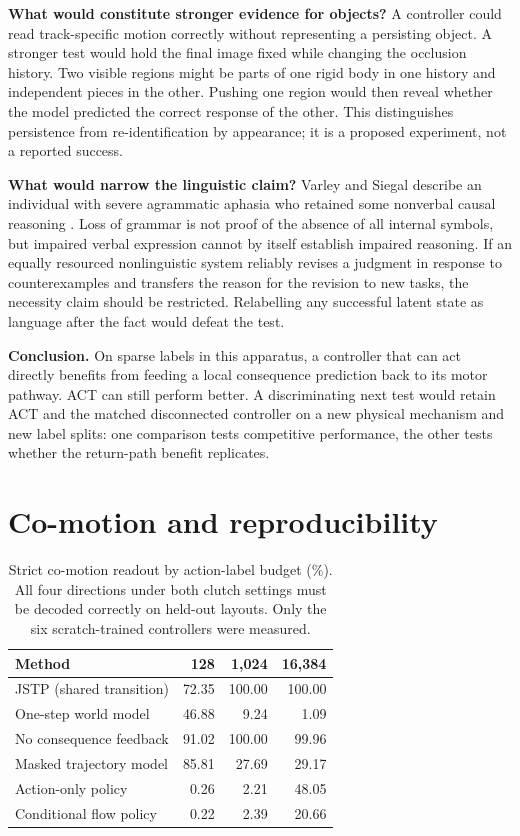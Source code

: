 \documentclass[11pt]{article}
\begin{document}
\textbf{What would constitute stronger evidence for objects?} A controller could read track-specific motion correctly without representing a persisting object. A stronger test would hold the final image fixed while changing the occlusion history. Two visible regions might be parts of one rigid body in one history and independent pieces in the other. Pushing one region would then reveal whether the model predicted the correct response of the other. This distinguishes persistence from re-identification by appearance; it is a proposed experiment, not a reported success.

\textbf{What would narrow the linguistic claim?} Varley and Siegal describe an individual with severe agrammatic aphasia who retained some nonverbal causal reasoning \cite{r16}. Loss of grammar is not proof of the absence of all internal symbols, but impaired verbal expression cannot by itself establish impaired reasoning. If an equally resourced nonlinguistic system reliably revises a judgment in response to counterexamples and transfers the reason for the revision to new tasks, the necessity claim should be restricted. Relabelling any successful latent state as language after the fact would defeat the test.

\textbf{Conclusion.} On sparse labels in this apparatus, a controller that can act directly benefits from feeding a local consequence prediction back to its motor pathway. ACT can still perform better. A discriminating next test would retain ACT and the matched disconnected controller on a new physical mechanism and new label splits: one comparison tests competitive performance, the other tests whether the return-path benefit replicates.

\FloatBarrier\appendix\setcounter{table}{0}

\section{Co-motion and reproducibility}

\begin{table}[htbp]
\centering\small\setlength{\tabcolsep}{3.5pt}
\caption{Strict co-motion readout by action-label budget (\%). All four directions under both clutch settings must be decoded correctly on held-out layouts. Only the six scratch-trained controllers were measured.}
\label{tab:A1}
\begin{tabularx}{\linewidth}{@{}>{\raggedright\arraybackslash}Xrrr@{}}
\toprule
\textbf{Method} & \textbf{128} & \textbf{1,024} & \textbf{16,384} \\
\midrule
JSTP (shared transition) & 72.35 & 100.00 & 100.00 \\
One-step world model & 46.88 & 9.24 & 1.09 \\
No consequence feedback & 91.02 & 100.00 & 99.96 \\
Masked trajectory model & 85.81 & 27.69 & 29.17 \\
Action-only policy & 0.26 & 2.21 & 48.05 \\
Conditional flow policy & 0.22 & 2.39 & 20.66 \\
\bottomrule
\end{tabularx}
\end{table}
\end{document}
